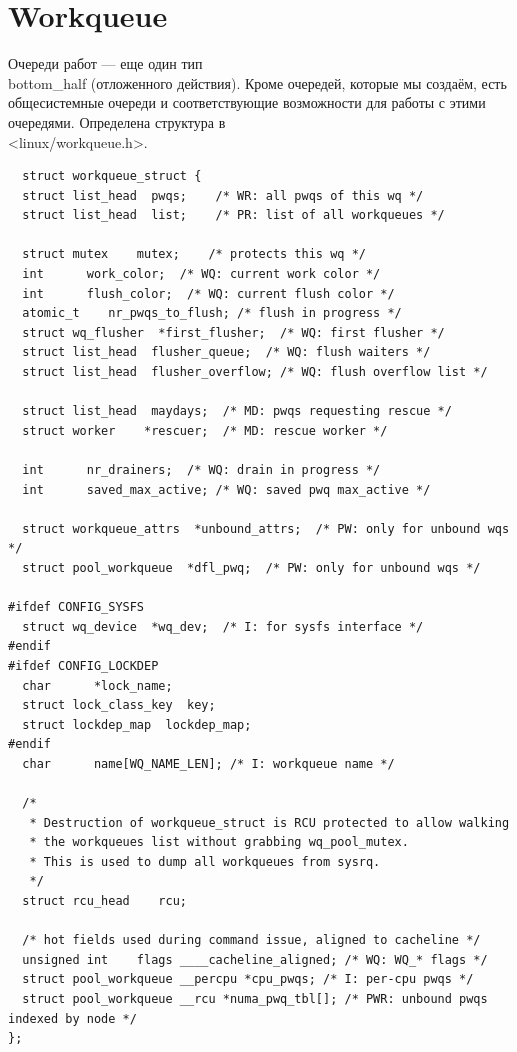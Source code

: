 \section{Workqueue}

Очереди работ --- еще один тип \\ bottom\_half (отложенного действия). Кроме очередей, которые мы создаём, есть общесистемные очереди и соответствующие возможности для работы с этими очередями. Определена структура в \\ <linux/workqueue.h>.

\begin{lstlisting}
  struct workqueue_struct {
  struct list_head  pwqs;    /* WR: all pwqs of this wq */
  struct list_head  list;    /* PR: list of all workqueues */

  struct mutex    mutex;    /* protects this wq */
  int      work_color;  /* WQ: current work color */
  int      flush_color;  /* WQ: current flush color */
  atomic_t    nr_pwqs_to_flush; /* flush in progress */
  struct wq_flusher  *first_flusher;  /* WQ: first flusher */
  struct list_head  flusher_queue;  /* WQ: flush waiters */
  struct list_head  flusher_overflow; /* WQ: flush overflow list */

  struct list_head  maydays;  /* MD: pwqs requesting rescue */
  struct worker    *rescuer;  /* MD: rescue worker */

  int      nr_drainers;  /* WQ: drain in progress */
  int      saved_max_active; /* WQ: saved pwq max_active */

  struct workqueue_attrs  *unbound_attrs;  /* PW: only for unbound wqs */
  struct pool_workqueue  *dfl_pwq;  /* PW: only for unbound wqs */

#ifdef CONFIG_SYSFS
  struct wq_device  *wq_dev;  /* I: for sysfs interface */
#endif
#ifdef CONFIG_LOCKDEP
  char      *lock_name;
  struct lock_class_key  key;
  struct lockdep_map  lockdep_map;
#endif
  char      name[WQ_NAME_LEN]; /* I: workqueue name */

  /*
   * Destruction of workqueue_struct is RCU protected to allow walking
   * the workqueues list without grabbing wq_pool_mutex.
   * This is used to dump all workqueues from sysrq.
   */
  struct rcu_head    rcu;

  /* hot fields used during command issue, aligned to cacheline */
  unsigned int    flags ____cacheline_aligned; /* WQ: WQ_* flags */
  struct pool_workqueue __percpu *cpu_pwqs; /* I: per-cpu pwqs */
  struct pool_workqueue __rcu *numa_pwq_tbl[]; /* PWR: unbound pwqs indexed by node */
};
\end{lstlisting}

